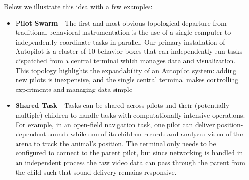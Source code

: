 Below we illustrate this idea with a few examples:

\clearpage

\begin{itemize}
    \item \textbf{Pilot Swarm} - The first and most obvious topological departure from traditional behavioral instrumentation is the use of a single computer to independently coordinate tasks in parallel. Our primary installation of Autopilot is a cluster of 10 behavior boxes that can independently run tasks dispatched from a central terminal which manages data and visualization. This topology highlights the expandability of an Autopilot system: adding new pilots is inexpensive, and the single central terminal makes controlling experiments and managing data simple.
    \item \textbf{Shared Task} -  Tasks can be shared across pilots and their (potentially multiple) children to handle tasks with computationally intensive operations. For example, in an open-field navigation task, one pilot can deliver position-dependent sounds while one of its children records and analyzes video of the arena to track the animal's position. The terminal only needs to be configured to connect to the parent pilot, but since networking is handled in an independent process the raw video data can pass through the parent from the child such that sound delivery remains responsive.

\end{itemize}

